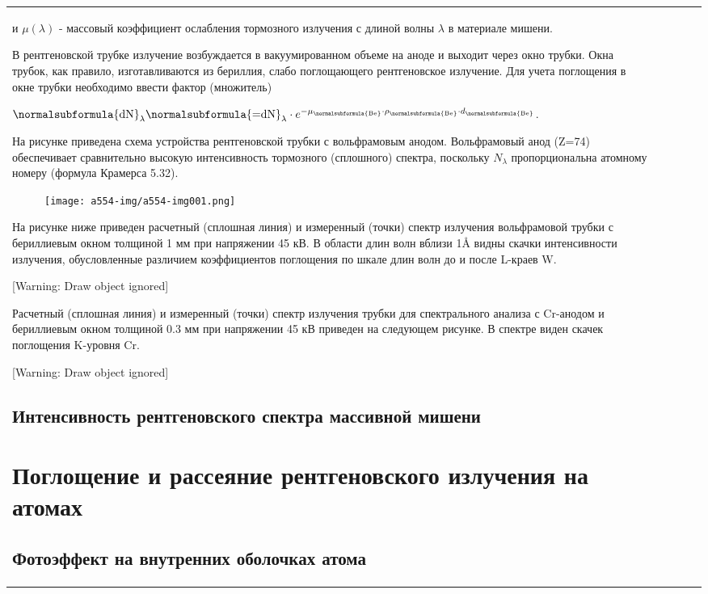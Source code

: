 \documentclass[a4paper,14pt, openany, twoside, draft]{extbook} %
\begin{document}
\begin{flushleft}
\begin{supertabular}{|m{1.7279999cm}|m{1.522cm}|m{1.522cm}|m{1.522cm}|m{1.744cm}|}
и  $\mu (\lambda )$ - массовый коэффициент ослабления тормозного излучения с длиной волны  $\lambda $ в материале мишени.

В рентгеновской трубке излучение возбуждается в вакуумированном объеме на аноде и выходит через окно трубки. Окна трубок, как правило, изготавливаются из бериллия, слабо поглощающего рентгеновское излучение. Для учета поглощения в окне трубки необходимо ввести фактор (множитель)

 $\normalsubformula{\text{dN}}_{\lambda }\normalsubformula{\text{=dN}}_{\lambda }\cdot e^{-\mu _{\normalsubformula{\text{Be}}}\cdot \rho _{\normalsubformula{\text{Be}}}\cdot d_{\normalsubformula{\text{Be}}}}$.\ \

На рисунке приведена схема устройства рентгеновской трубки с вольфрамовым анодом. Вольфрамовый анод (Z=74) обеспечивает сравнительно высокую интенсивность тормозного (сплошного) спектра, поскольку  $N_{\lambda }$ пропорциональна атомному номеру (формула Крамерса 5.32).

\begin{figure}
\centering
\texttt{[image: a554-img/a554-img001.png]}
\end{figure}
На рисунке ниже приведен расчетный (сплошная линия) и измеренный (точки) спектр излучения вольфрамовой трубки с бериллиевым окном толщиной 1 мм при напряжении 45 кВ. В области длин волн вблизи 1Å видны скачки интенсивности излучения, обусловленные различием коэффициентов поглощения по шкале длин волн до и после L{}-краев W.

[Warning: Draw object ignored]

Расчетный (сплошная линия) и измеренный (точки) спектр излучения трубки для спектрального анализа с Cr{}-анодом и бериллиевым окном толщиной 0.3 мм при напряжении 45 кВ приведен на следующем рисунке. В спектре виден скачек поглощения K{}-уровня Cr.

[Warning: Draw object ignored]


\section{Интенсивность рентгеновского спектра массивной мишени}

\chapter{Поглощение и рассеяние рентгеновского излучения на атомах}
\label{cha:absorbtion}

\section{Фотоэффект на внутренних оболочках атома}

\end{supertabular}
\end{flushleft}
\end{document}
